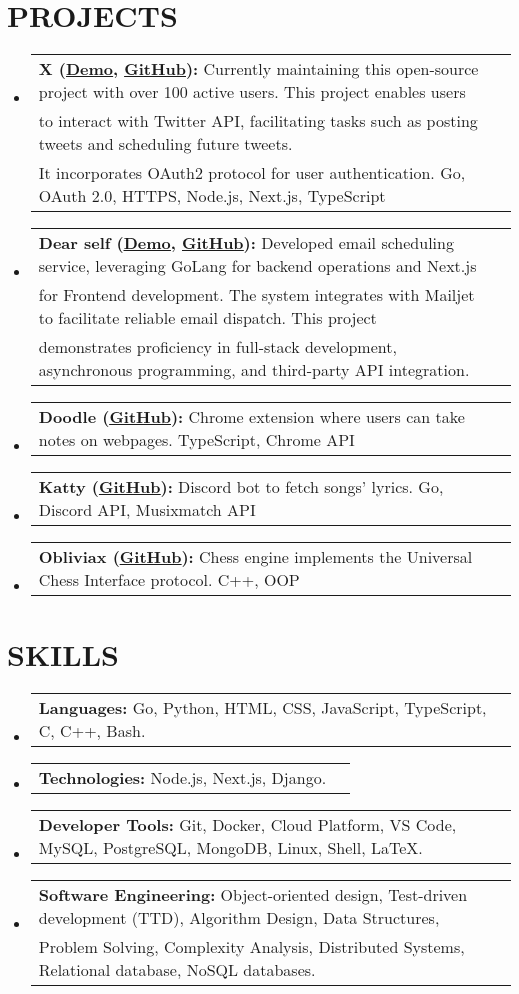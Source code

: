 \documentclass[letterpaper,11pt]{article}
\makeatletter
\newcommand{\resumeProjectHeading}[2]{
    \item
    \begin{tabular*}{\textwidth}{l@{\extracolsep{\fill}}r}
      \small#1 & #2 \\
    \end{tabular*}\vspace{-7pt}
}
\newcommand{\resumeSubHeadingListStart}{\begin{itemize}[leftmargin=0in, label={}]}
\newcommand{\resumeSubHeadingListEnd}{\end{itemize}}
\makeatother
\begin{document}
\section{PROJECTS}
    \resumeSubHeadingListStart
      \resumeProjectHeading
        {\textbf{X (\href{https://x-blush.vercel.app/}{\underline{Demo}}, \href{https://github.com/devhindo/x}{\underline{GitHub}}):} Currently maintaining this open-source project with over 100 active users. This project enables users \\to interact with Twitter API, facilitating tasks such as posting tweets and scheduling future tweets. \\It incorporates OAuth2 protocol for user authentication. Go, OAuth 2.0, HTTPS, Node.js, Next.js, TypeScript}{}
      \resumeProjectHeading
        {\textbf{Dear self (\href{https://dearself.vercel.app/}{\underline{Demo}}, \href{https://github.com/devhindo/dearself}{\underline{GitHub}}):} Developed email scheduling service, leveraging GoLang for backend operations and Next.js \\for Frontend development. The system integrates with Mailjet to facilitate reliable email dispatch. This project\\ demonstrates proficiency in full-stack development, asynchronous programming, and third-party API integration.}{}
      \resumeProjectHeading
        {\textbf{Doodle (\href{https://github.com/devhindo/doodle}{\underline{GitHub}}):}  Chrome extension where users can take notes on webpages. TypeScript, Chrome API}{}
      \resumeProjectHeading
        {\textbf{Katty (\href{https://github.com/devhindo/katty}{\underline{GitHub}}):}  Discord bot to fetch songs’ lyrics. Go, Discord API, Musixmatch API}{}
      \resumeProjectHeading
        {\textbf{Obliviax (\href{https://github.com/devhindo/obliviax}{\underline{GitHub}}):}  Chess engine implements the Universal Chess Interface protocol. C++, OOP}{}
    \resumeSubHeadingListEnd

%
\section{SKILLS}
    \resumeSubHeadingListStart
      \resumeProjectHeading
          {\textbf{Languages:} Go, Python, HTML, CSS, JavaScript, TypeScript, C, C\small{++}, Bash.}{}
      \resumeProjectHeading
          {\textbf{Technologies:} Node.js, Next.js, Django.}{}
      \resumeProjectHeading
          {\textbf{Developer Tools:} Git, Docker, Cloud Platform, VS Code, MySQL, PostgreSQL, MongoDB, Linux, Shell, LaTeX.}{}
      \resumeProjectHeading
          {\textbf{Software Engineering:} Object-oriented design, Test-driven development (TTD), Algorithm Design, Data Structures,\\Problem Solving, Complexity Analysis, Distributed Systems, Relational database, NoSQL databases.}{}
    \resumeSubHeadingListEnd
\end{document}
